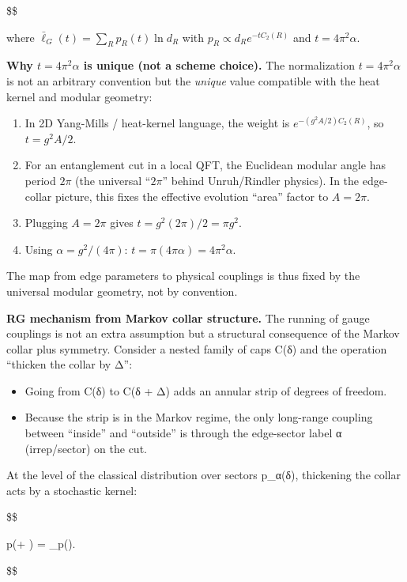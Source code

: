\documentclass[11pt,a4paper]{article}
\theoremstyle{remark}
\providecommand{\tightlist}{%
  \setlength{\itemsep}{0pt}\setlength{\parskip}{0pt}}
\begin{document}
\$\$

where \(\bar{\ell}_G(t) = \sum_R p_R(t) \ln d_R\) with \(p_R \propto d_R e^{-t C_2(R)}\)
and \(t = 4\pi^2 \alpha\).

\textbf{Why \(t = 4\pi^2 \alpha\) is unique (not a scheme choice).} The normalization
\(t = 4\pi^2 \alpha\) is not an arbitrary convention but the \emph{unique} value
compatible with the heat kernel and modular geometry:

\begin{enumerate}
\def\labelenumi{\arabic{enumi}.}
\item
  In 2D Yang-Mills / heat-kernel language, the weight is
  \(e^{-(g^2 A/2) C_2(R)}\), so \(t = g^2 A / 2\).
\item
  For an entanglement cut in a local QFT, the Euclidean modular angle has
  period \(2\pi\) (the universal ``\(2\pi\)'' behind Unruh/Rindler physics). In
  the edge-collar picture, this fixes the effective evolution ``area'' factor
  to \(A = 2\pi\).
\item
  Plugging \(A = 2\pi\) gives \(t = g^2 (2\pi)/2 = \pi g^2\).
\item
  Using \(\alpha = g^2/(4\pi)\): \(t = \pi (4\pi \alpha) = 4\pi^2 \alpha\).
\end{enumerate}

The map from edge parameters to physical couplings is thus fixed by the
universal modular geometry, not by convention.

\textbf{RG mechanism from Markov collar structure.} The running of gauge couplings is not an extra assumption but a structural consequence of the Markov collar plus symmetry. Consider a nested family of caps C(δ) and the operation ``thicken the collar by Δ'':

\begin{itemize}
\tightlist
\item
  Going from C(δ) to C(δ + Δ) adds an annular strip of degrees of freedom.
\item
  Because the strip is in the Markov regime, the only long-range coupling between ``inside'' and ``outside'' is through the edge-sector label α (irrep/sector) on the cut.
\end{itemize}

At the level of the classical distribution over sectors p\_α(δ), thickening the collar acts by a stochastic kernel:

\$\$

p(\delta + \Delta) = \_\Delta \cdot p(\delta).

\$\$
\end{document}
